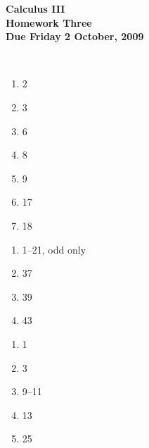 \documentclass[12pt]{article}
\begin{document}
\pagestyle{empty}
 
\begin{center}
{\large {\bf Calculus III}}\\
\medskip
{\large {\bf Homework Three}}\\
\medskip
{ {\bf Due Friday 2 October, 2009}}\\
\end{center}

\hspace{2mm}\\


\begin{enumerate}
\setlength{\itemsep}{-1mm}
  \item 2
  \item 3
  \item 6
  \item 8
  \item 9
  \item 17
  \item 18

\end{enumerate}


\begin{enumerate}
\setlength{\itemsep}{-1mm}
  \item 1--21, odd only
  \item 37
  \item 39
  \item 43
\end{enumerate}


\begin{enumerate}
\setlength{\itemsep}{-1mm}
  \item 1
  \item 3
  \item 9--11
  \item 13
  \item 25
\end{enumerate}
\end{document}
